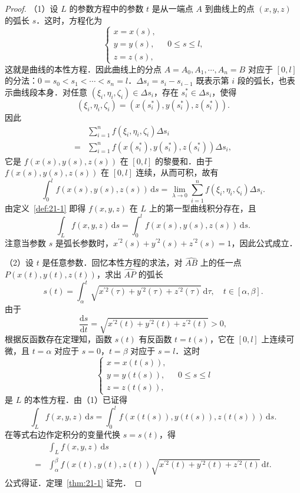 \begin{proof}
（1）设 $L$ 的参数方程中的参数 $t$ 是从一端点 $A$ 到曲线上的点 $(x,y,z)$ 的弧长 $s$．这时，方程化为
\[
\begin{cases}
x=x(s),\\
y=y(s),\\
z=z(s),
\end{cases}
\quad 0\leqslant s\leqslant l,
\]
这就是曲线的本性方程．因此曲线上的分点 $A=A_{0},A_{1},\cdots,A_{n}=B$ 对应于 $[0,l]$ 的分法：$0=s_{0}<s_{1}<\cdots<s_{n}=l$．$\Delta s_{i}=s_{i}-s_{i-1}$ 既表示第 $i$ 段的弧长，也表示曲线段本身．对任意 $(\xi_{i},\eta_{i},\zeta_{i})\in\Delta s_{i}$，存在 $s_{i}^{*}\in\Delta s_{i}$，使得
\[
(\xi_{i},\eta_{i},\zeta_{i})=(x(s_{i}^{*}),y(s_{i}^{*}),z(s_{i}^{*})).
\]
因此
\[
\begin{aligned}
&\sum_{i=1}^{n}f(\xi_{i},\eta_{i},\zeta_{i})\Delta s_{i}\\
={}&\sum_{i=1}^{n}f(x(s_{i}^{*}),y(s_{i}^{*}),z(s_{i}^{*}))\Delta s_{i},
\end{aligned}
\]
它是 $f(x(s),y(s),z(s))$ 在 $[0,l]$ 的黎曼和．由于 $f(x(s),y(s),z(s))$ 在 $[0,l]$ 连续，从而可积，故有
\[
\int_{0}^{l}f(x(s),y(s),z(s))\,\mathrm{d}s=\lim_{\lambda\to0}\sum_{i=1}^{n}f(\xi_{i},\eta_{i},\zeta_{i})\Delta s_{i}.
\]
由定义~\ref{def:21-1} 即得 $f(x,y,z)$ 在 $L$ 上的第一型曲线积分存在，且
\[
\int_{L}f(x,y,z)\,\mathrm{d}s=\int_{0}^{l}f(x(s),y(s),z(s))\,\mathrm{d}s.
\]
注意当参数 $s$ 是弧长参数时，$x^{\prime2}(s)+y^{\prime2}(s)+z^{\prime2}(s)=1$，因此公式成立．

（2）设 $t$ 是任意参数．回忆本性方程的求法，对 $\widehat{AB}$ 上的任一点 $P(x(t),y(t),z(t))$，求出 $\widehat{AP}$ 的弧长
\[
s(t)=\int_{\alpha}^{t}\sqrt{x^{\prime2}(\tau)+y^{\prime2}(\tau)+z^{\prime2}(\tau)}\,\mathrm{d}\tau,\quad t\in[\alpha,\beta].
\]
由于
\[
\frac{\mathrm{d}s}{\mathrm{d}t}=\sqrt{x^{\prime2}(t)+y^{\prime2}(t)+z^{\prime2}(t)}>0,
\]
根据反函数存在定理知，函数 $s(t)$ 有反函数 $t=t(s)$，它在 $[0,l]$ 上连续可微，且 $t=\alpha$ 对应于 $s=0$，$t=\beta$ 对应于 $s=l$．这时
\[
\begin{cases}
x=x(t(s)),\\
y=y(t(s)),\\
z=z(t(s)),
\end{cases}
\quad 0\leqslant s\leqslant l
\]
是 $L$ 的本性方程．由（1）已证得
\[
\int_{L}f(x,y,z)\,\mathrm{d}s=\int_{0}^{l}f(x(t(s)),y(t(s)),z(t(s)))\,\mathrm{d}s.
\]
在等式右边作定积分的变量代换 $s=s(t)$，得
\[
\begin{aligned}
&\int_{L}f(x,y,z)\,\mathrm{d}s\\
={}&\int_{\alpha}^{\beta}f(x(t),y(t),z(t))\sqrt{x^{\prime2}(t)+y^{\prime2}(t)+z^{\prime2}(t)}\,\mathrm{d}t.
\end{aligned}
\]
公式得证．定理~\ref{thm:21-1} 证完．
\end{proof}

